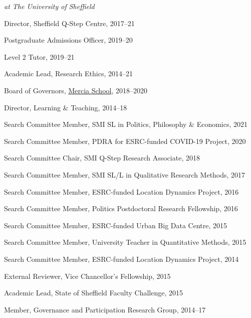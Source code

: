 \documentclass[12pt]{article}
\newcommand{\halfblankline}{\quad\vspace{-0.5\baselineskip}\pagebreak[3]}
\begin{document}
    \emph{at The University of Sheffield}
        \begin{innerlist}
        \item[] Director, Sheffield Q-Step Centre, 2017--21
        \item[] Postgraduate Admissions Officer, 2019--20
        \item[] Level 2 Tutor, 2019--21
        \item[] Academic Lead, Research Ethics, 2014--21
        \item[] Board of Governors, \href{https://www.merciaschool.com/}
        				{Mercia School}, 2018--2020
        \item[] Director, Learning \& Teaching, 2014--18
        \item[] Search Committee Member, SMI SL in Politics, Philosophy \& Economics, 2021        
        \item[] Search Committee Member, PDRA for ESRC-funded COVID-19 Project, 2020
        \item[] Search Committee Chair, SMI Q-Step Research Associate, 2018
        \item[] Search Committee Member, SMI SL/L in Qualitative Research Methods, 2017        
        \item[] Search Committee Member, ESRC-funded Location Dynamics Project, 2016
        \item[] Search Committee Member, Politics Postdoctoral Research Fellowship, 2016
        \item[] Search Committee Member, ESRC-funded Urban Big Data Centre, 2015
		\item[] Search Committee Member, University Teacher in Quantitative Methods, 2015
        \item[] Search Committee Member, ESRC-funded Location Dynamics Project, 2014
        \item[] External Reviewer, Vice Chancellor's Fellowship, 2015
        \item[] Academic Lead, State of Sheffield Faculty Challenge, 2015
        \item[] Member, Governance and Participation Research Group, 2014--17
        \end{innerlist}
      
\halfblankline
        
\end{document}
